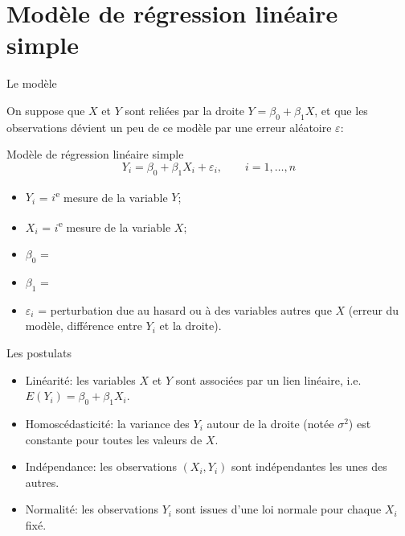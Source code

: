 \documentclass{BeamerTemplate}
\begin{document}
\section{Modèle de régression linéaire simple}

\begin{frame}[t]{Le modèle}

On suppose que $X$ et $Y$ sont reliées par la droite $Y=\beta_0+\beta_1X$, et que
les observations dévient un peu de ce modèle par une erreur aléatoire
$\varepsilon$:

\begin{Boite}{Modèle de régression linéaire simple}
\[
Y_i=\beta_0+\beta_1X_i+\varepsilon_i,\qquad i=1,\ldots,n
\]
\end{Boite}

\begin{itemize}\itemsep1mm
  \item $Y_i$ = $i$\textsuperscript{e} mesure de la variable $Y$;
  \item $X_i$ = $i$\textsuperscript{e} mesure de la variable $X$;
  \item $\beta_0$ =
  \item $\beta_1$ =
  \item $\varepsilon_i$ = perturbation due au hasard ou à des variables autres que
  $X$ (erreur du modèle, différence entre $Y_i$ et la droite).
\end{itemize}

\end{frame}

\begin{frame}[t]{Les postulats}

\begin{itemize}\itemsep1.5mm
  \item[(P1)] \alert{Linéarité}: les variables $X$ et $Y$ sont associées par un
  lien linéaire, i.e.\ $E(Y_i)=\beta_0+\beta_1X_i$.
  \item<2->[(P2)] \alert{Homoscédasticité}: la \alert{variance} des $Y_i$ autour de
  la droite (notée $\sigma^2$) est \alert{constante} pour toutes les valeurs de $X$.
  \item<3->[(P3)] \alert{Indépendance}: les observations $(X_i,Y_i)$ sont
  indépendantes les unes des autres.
  \item<4->[(P4)] \alert{Normalité}: les observations $Y_i$ sont issues d'une loi
  normale pour chaque $X_i$ fixé.
\end{itemize}


\end{frame}
\end{document}
